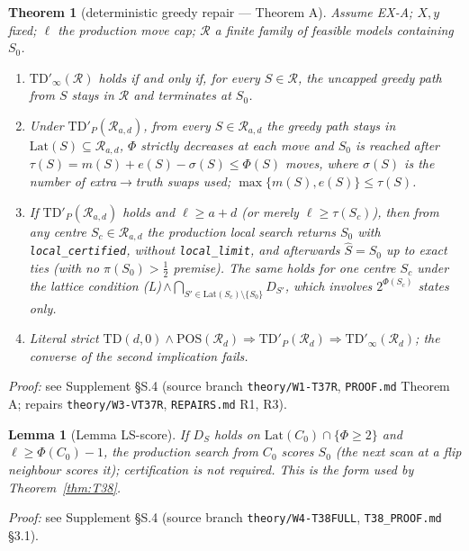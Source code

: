 \documentclass[11pt]{article}
\newtheorem{thmpart}{Theorem}[theorem]
\newtheorem{lemma}{Lemma}
\theoremstyle{definition}
\theoremstyle{remark}
\newcommand{\Sz}{S_0}
\newcommand{\Sh}{\widehat S}
\newcommand{\cR}{\mathcal R}
\newcommand{\Lat}{\mathrm{Lat}}
\begin{document}
\begin{thmpart}[deterministic greedy repair --- Theorem A]\label{thm:T37}
Assume EX-A; $X,y$ fixed; $\ell$ the production move cap; $\cR$ a finite family of feasible models containing $\Sz$.
\begin{enumerate}
\item[(A1)] $\mathrm{TD}'_\infty(\cR)$ holds if and only if, for every $S\in\cR$, the uncapped greedy path from $S$ stays in $\cR$ and terminates at $\Sz$.
\item[(A2)] Under $\mathrm{TD}'_P(\cR_{a,d})$, from every $S\in\cR_{a,d}$ the greedy path stays in $\Lat(S)\subseteq\cR_{a,d}$, $\Phi$ strictly
decreases at each move and $\Sz$ is reached after $\tau(S)=m(S)+e(S)-\sigma(S)\le\Phi(S)$ moves, where $\sigma(S)$ is the number of
extra$\to$truth swaps used; $\max\{m(S),e(S)\}\le\tau(S)$.
\item[(A3)] If $\mathrm{TD}'_P(\cR_{a,d})$ holds and $\ell\ge a+d$ (or merely $\ell\ge\tau(S_c)$), then from any centre $S_c\in\cR_{a,d}$ the production
local search returns $\Sz$ with \texttt{local\_certified}, without \texttt{local\_limit}, and afterwards $\Sh=\Sz$ up to exact ties
(with \emph{no} $\pi(\Sz)>\tfrac12$ premise). The same holds for one centre $S_c$ under the lattice condition
(L)\,$\wedge\bigcap_{S'\in\Lat(S_c)\setminus\{\Sz\}}D_{S'}$, which involves $2^{\Phi(S_c)}$ states only.
\item[(A5, repaired)] Literal strict $\mathrm{TD}(d,0)\wedge\mathrm{POS}(\cR_d)\Rightarrow\mathrm{TD}'_P(\cR_d)\Rightarrow\mathrm{TD}'_\infty(\cR_d)$; the converse of the
second implication fails.
\end{enumerate}
\end{thmpart}
\noindent\emph{Proof:} see Supplement \S S.4 (source branch \texttt{theory/W1-T37R}, \texttt{PROOF.md} Theorem A; repairs \texttt{theory/W3-VT37R}, \texttt{REPAIRS.md} R1, R3).

\begin{lemma}[Lemma LS-score]\label{lem:LSscore}
If $D_S$ holds on $\Lat(C_0)\cap\{\Phi\ge2\}$ and $\ell\ge\Phi(C_0)-1$, the production search from $C_0$ \emph{scores} $\Sz$ (the next scan at
a flip neighbour scores it); certification is not required. This is the form used by Theorem~\ref{thm:T38}.
\end{lemma}
\noindent\emph{Proof:} see Supplement \S S.4 (source branch \texttt{theory/W4-T38FULL}, \texttt{T38\_PROOF.md} \S3.1).
\end{document}
